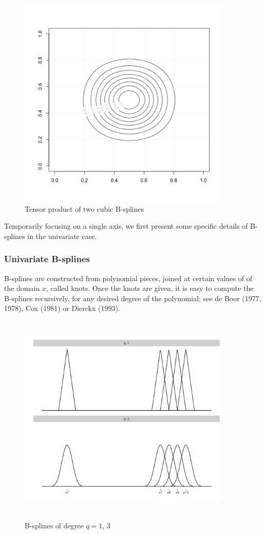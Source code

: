 \documentclass[12pt]{article}
\newcommand*\needsparaphrased{\color{red}}
\newcommand*\outlineskeleton{\color{green}}
\begin{document}
\begin{figure}[H]
  \centering
  \graphicspath{{img/}}
  \includegraphics[width=4in, height=4in]{bicubic_bspline_contour.png}
  \caption{Tensor product of two cubic B-splines}\label{fig:bicubic_bspline_contour}
\end{figure} 

Temporarily focusing on a single axis, we first present some specific details of B-splines in the univariate case. 
\subsubsection{{\outlineskeleton Univariate B-splines}}

{\needsparaphrased B-splines are constructed from polynomial pieces, joined at certain values of of the domain $x$, called knots. Once the knots are given, it is easy to compute the B-splines recursively, for any desired degree of the polynomial; see de Boor (1977, 1978), Cox (1981) or Dierckx (1993).  }

\begin{figure}[H]
  \centering
  \graphicspath{{img/}}
  \includegraphics[width=4in, height=4in]{uni_linear_cubic_bsplines.png}
  \caption{B-splines of degree $q=1$, $3$}\label{fig:uni_linear_cubic_bsplines}
\end{figure} 
\end{document}
